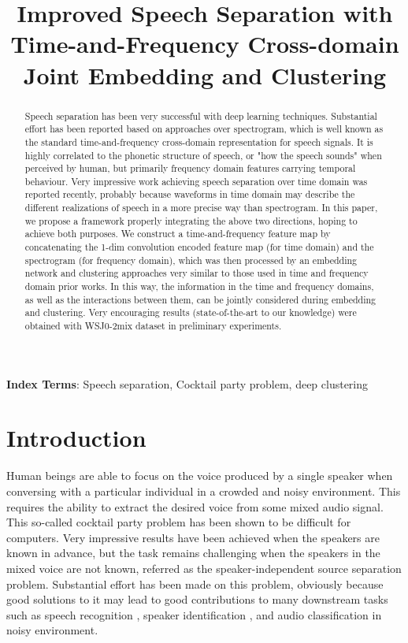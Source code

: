 \documentclass[a4paper]{article}
\title{Improved Speech Separation with Time-and-Frequency Cross-domain Joint Embedding and Clustering}
\begin{document}
\makeatletter
\newcommand*{\rom}[1]{\expandafter\@slowromancap\romannumeral #1@}
\makeatother

\maketitle
\begin{abstract}



Speech separation has been very successful with deep learning techniques. Substantial effort has been reported based on approaches over spectrogram, which is well known as the standard time-and-frequency cross-domain representation for speech signals. It is highly correlated to the phonetic structure of speech, or "how the speech sounds" when perceived by human, but primarily frequency domain features carrying temporal behaviour. Very impressive work achieving speech separation over time domain was reported recently, probably because waveforms in time domain may describe the different realizations of speech in a more precise way than spectrogram. In this paper, we propose a framework properly integrating the above two directions, hoping to achieve both purposes. We construct a time-and-frequency feature map by concatenating the 1-dim convolution encoded feature map (for time domain) and the spectrogram (for frequency domain), which was then processed by an embedding network and clustering approaches very similar to those used in time and frequency domain prior works. In this way, the information in the time and frequency domains, as well as the interactions between them, can be jointly considered during embedding and clustering. Very encouraging results (state-of-the-art to our knowledge) were obtained with WSJ0-2mix dataset in preliminary experiments.
 
\end{abstract}
\noindent\textbf{Index Terms}: Speech separation, Cocktail party problem, deep clustering

\section{Introduction}

Human beings are able to focus on the voice produced by a single speaker when conversing with a particular individual in a crowded and noisy environment. This requires the ability to extract the desired voice from some mixed audio signal. This so-called cocktail party problem has been shown to be difficult for computers. Very impressive results have been achieved when the speakers are known in advance, but the task remains challenging when the speakers in the mixed voice are not known, referred as the speaker-independent source separation problem. Substantial effort has been made on this problem, obviously because good solutions to it may lead to good contributions to many downstream tasks such as speech recognition \cite{kim2017joint}, speaker identification \cite{nagrani2017voxceleb}, and audio classification \cite{gemmeke2017audio} in noisy environment.
\end{document}
